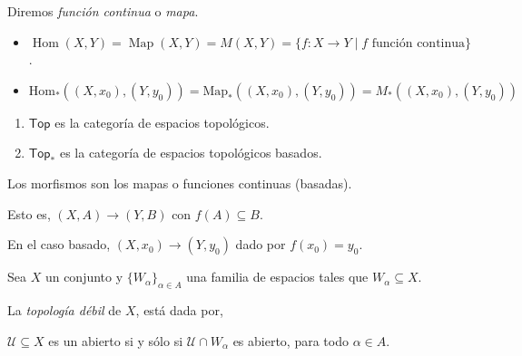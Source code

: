 \begin{tcolorbox}[colback=antiquefuchsia!15!white,colframe=antiquefuchsia!75!black,title=\textbf{Convención}]
    Diremos \textit{función continua} o \textit{mapa}.  
    \begin{itemize}[noitemsep, topsep=0pt]
        \item[] \(\operatorname{Hom}(X, Y)= \operatorname{Map}(X, Y)=M(X, Y)= \{f\colon X\to Y \mid f \text{ función continua}\}\).

        \item[] \(\operatorname{Hom_{\ast}}((X, x_0), (Y, y_0))= \operatorname{Map_{\ast}}((X, x_0), (Y, y_0))=M_{\ast}((X, x_0), (Y, y_0))\)
    
    \end{itemize}
\end{tcolorbox}

\begin{tcolorbox}[colback=blue-violet!5!white,colframe=blue-violet!75!black,title=\textbf{Definición}.]
    \begin{enumerate}[noitemsep, topsep=0pt]
        \item[] \(\mathsf{Top}\) es la categoría de espacios topológicos. 
        \item[] \(\mathsf{Top}_{\ast}\) es la categoría de espacios topológicos basados.
    \end{enumerate}
    \tcblower 
    Los morfismos son los mapas o funciones continuas (basadas).
    
    Esto es, \((X, A) \rightarrow (Y, B)\) con \(f(A)\subseteq B\).
    
    En el caso basado, \((X, x_0)\rightarrow (Y, y_0)\) dado por \(f(x_0)=y_0\).
\end{tcolorbox}


\begin{tcolorbox}[colback=blue-violet!5!white,colframe=blue-violet!75!black,title=\textbf{Definición}.]
    Sea \(X\) un conjunto y \(\{W_{\alpha}\}_{\alpha\in A}\) una familia de espacios tales que \(W_{\alpha}\subseteq X\).

    La \textit{topología débil} de \(X\), está dada por,
    
    \begin{center}
        \(\mathcal{U}\subseteq X\) es un abierto si y sólo si \(\mathcal{U}\cap W_{\alpha}\) es abierto, para todo \(\alpha\in A\).
    \end{center}
\end{tcolorbox}

